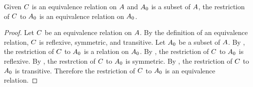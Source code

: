 \documentclass[../main.tex]{subfiles}
\begin{document}
\begin{thm}
	Given \({C}\) is an equivalence relation on \({A}\)
	and \({A_0}\) is a subset of \({A}\), the restriction of
	\({C}\) to \({A_0}\) is an equivalence relation on
	\({A_0}\).
\end{thm}
\begin{proof}
	Let \({C}\) be an equivalence relation on \({A}\).
	By the definition of an equivalence relation, \({C}\) is
	reflexive, symmetric, and transitive. Let \({A_0}\) be a subset
	of \({A}\). By , the restriction of
	\({C}\) to \({A_0}\) is a relation on
	\({A_0}\). By , the restriction of
	\({C}\) to \({A_0}\) is reflexive. By
	, the restrction of \({C}\) to
	\({A_0}\) is symmetric. By , the restriction of
	\({C}\) to \({A_0}\) is transitive. Therefore the
	restriction of \({C}\) to \({A_0}\) is an equivalence
	relation.
\end{proof}
\end{document}

